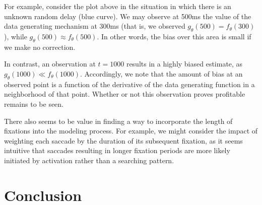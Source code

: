 \documentclass{article}
\begin{document}
For example, consider the plot above in the situation in which there is an unknown random delay (blue curve). We may observe at 500ms the value of the data generating mechanism at 300ms (that is, we observed $g_{\theta}(500) = f_{\theta}(300)$), while $g_{\theta}(500) \approx f_{\theta}(500)$. In other words, the bias over this area is small if we make no correction.

In contrast, an observation at $t = 1000$ results in a highly biased estimate, as $g_{\theta}(1000) \ll f_{\theta}(1000)$. Accordingly, we note that the amount of bias at an observed point is a function of the derivative of the data generating function in a neighborhood of that point. Whether or not this observation proves profitable remains to be seen.

There also seems to be value in finding a way to incorporate the length of fixations into the modeling process. For example, we might consider the impact of weighting each saccade by the duration of its subsequent fixation, as it seems intuitive that saccades resulting in longer fixation periods are more likely initiated by activation rather than a searching pattern.


\section{Conclusion}

\end{document}
